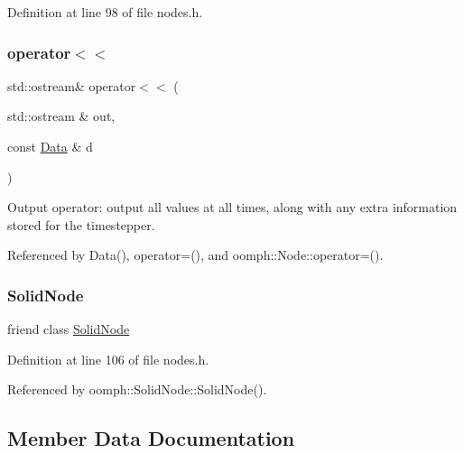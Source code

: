Definition at line 98 of file nodes.\+h.

\mbox{\label{classoomph_1_1Data_abad7fa6bf4988e5a0336ba3ce71b5147}} 
\subsubsection{\texorpdfstring{operator$<$$<$}{operator<<}}
{\footnotesize\ttfamily std\+::ostream\& operator$<$$<$ (\begin{DoxyParamCaption}\item[{std\+::ostream \&}]{out,  }\item[{const \hyperlink{classoomph_1_1Data}{Data} \&}]{d }\end{DoxyParamCaption})\hspace{0.3cm}{\ttfamily [friend]}}

Output operator\+: output all values at all times, along with any extra information stored for the timestepper. 

Referenced by Data(), operator=(), and oomph\+::\+Node\+::operator=().

\mbox{\label{classoomph_1_1Data_afe40e893f1c68d80f58bdbfc1e1d3cdc}} 
\subsubsection{\texorpdfstring{Solid\+Node}{SolidNode}}
{\footnotesize\ttfamily friend class \hyperlink{classoomph_1_1SolidNode}{Solid\+Node}\hspace{0.3cm}{\ttfamily [friend]}}



Definition at line 106 of file nodes.\+h.



Referenced by oomph\+::\+Solid\+Node\+::\+Solid\+Node().



\subsection{Member Data Documentation}
\mbox{\label{classoomph_1_1Data_a4e1e4a227baddb8f075761c48b06f4af}} 
